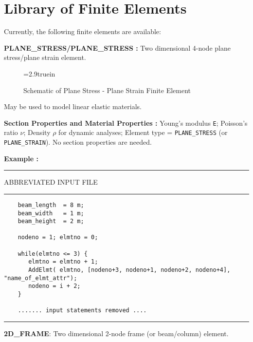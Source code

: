 \clearpage
\section{Library of Finite Elements}
\label{section-finite-element-library}

\vspace{0.15 in}\noindent
Currently, the following finite elements are available:

\vspace{0.15 in}\noindent
{\bf PLANE\_STRESS/PLANE\_STRESS :} Two dimensional 4-node
plane stress/plane strain element.

\begin{figure} [ht]
\epsfxsize=2.9truein
\centerline{}
\caption{Schematic of Plane Stress - Plane Strain Finite Element}
\label{fig:fe-plane-stress-plane-strain}
\end{figure}

\vspace{0.15 in}\noindent
May be used to model linear elastic materials.  

\vspace{0.15 in}\noindent
{\bf Section Properties and Material Properties :} 
Young's modulus {\tt E}; Poisson's ratio $\nu$;
Density $\rho$ for dynamic analyses;
Element type = {\tt PLANE\_STRESS} (or {\tt PLANE\_STRAIN}).
No section properties are needed.

\vspace{0.15 in}\noindent
{\bf Example :} 

\vspace{0.10 in}
\begin{footnotesize}
\noindent
{\rule{2.1 in}{0.035 in} ABBREVIATED INPUT FILE \rule{2.1 in}{0.035 in} }
\begin{verbatim}
    beam_length  = 8 m;
    beam_width   = 1 m;
    beam_height  = 2 m;

    nodeno = 1; elmtno = 0;

    while(elmtno <= 3) {
       elmtno = elmtno + 1;
       AddElmt( elmtno, [nodeno+3, nodeno+1, nodeno+2, nodeno+4], "name_of_elmt_attr");
       nodeno = i + 2;
    }

    ....... input statements removed .... 

\end{verbatim}
\rule{6.25 in}{0.035 in}
\end{footnotesize}

\clearpage
\vspace{0.15 in}\noindent
{\bf 2D\_FRAME}: Two dimensional 2-node frame (or beam/column) element.

